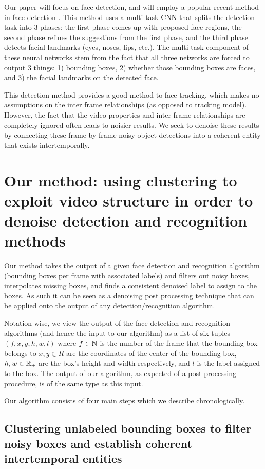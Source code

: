 \documentclass{article}
\begin{document}
Our paper will focus on face detection, and will employ a popular recent
method in face detection \cite{mtcnn}. This method uses a multi-task CNN
that splits the detection task into 3 phases: the first phase comes up with
proposed face regions, the second phase refines the suggestions from the
first phase, and the third phase detects facial landmarks (eyes, noses, lips, etc.).
The multi-task component of these neural networks stem from the fact that
all three networks are forced to output 3 things: 1) bounding boxes, 2) whether
those bounding boxes are faces, and 3) the facial landmarks on the detected
face.

This detection method provides a good method to face-tracking, which makes no assumptions on
the inter frame relationships (as opposed to tracking model). However, the fact that the video properties and inter frame relationships
are completely ignored often leads to noisier results. We seek to denoise these results by connecting these frame-by-frame noisy object detections into
a coherent entity that exists intertemporally.

\section{Our method: using clustering to exploit video structure in order to denoise detection and recognition methods}

Our method takes the output of a given face detection and recognition algorithm (bounding boxes per frame with associated labels) and filters out noisy
boxes, interpolates missing boxes, and finds a consistent denoised label to assign to the boxes. As such it can be seen as a denoising post processing technique that
can be applied onto the output of any detection/recognition algorithm.

Notation-wise, we view the output of the face detection and recognition
algorithms (and hence the input to our algorithm) as a list of six tuples $(f, x, y, h, w, l)$ where $f \in \operatorname{\mathbb{N}}$ is the number of the frame that the
bounding box belongs to $x, y \in R$ are the coordinates of the
center of the bounding box, $h, w \in \operatorname{\mathbb{R}}_+$ are the box's height and width respectively, and $l$ is the label assigned to the box. The output of our
algorithm, as expected of a post processing procedure, is of the same type as this input.

Our algorithm consists of four main steps which we describe chronologically.

\subsection{Clustering unlabeled bounding boxes to filter noisy boxes and establish coherent intertemporal entities}
\end{document}
